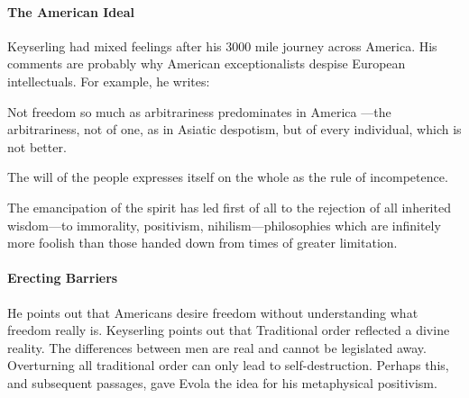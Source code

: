\paragraph{The American Ideal}


Keyserling had mixed feelings after his 3000 mile journey across America. His comments are probably why American exceptionalists despise European intellectuals. For example, he writes:

\begin{quotationx}
Not freedom so much as arbitrariness predominates in America ---the arbitrariness, not of one, as in Asiatic despotism, but of every individual, which is not better.

The will of the people expresses itself on the whole as the rule of incompetence.

The emancipation of the spirit has led first of all to the rejection of all inherited wisdom---to immorality, positivism, nihilism---philosophies which are infinitely more foolish than those handed down from times of greater limitation.
\end{quotationx}


\paragraph{Erecting Barriers}


He points out that Americans desire freedom without understanding what freedom really is. Keyserling points out that Traditional order reflected a divine reality. The differences between men are real and cannot be legislated away. Overturning all traditional order can only lead to self-destruction. Perhaps this, and subsequent passages, gave Evola the idea for his metaphysical positivism.

